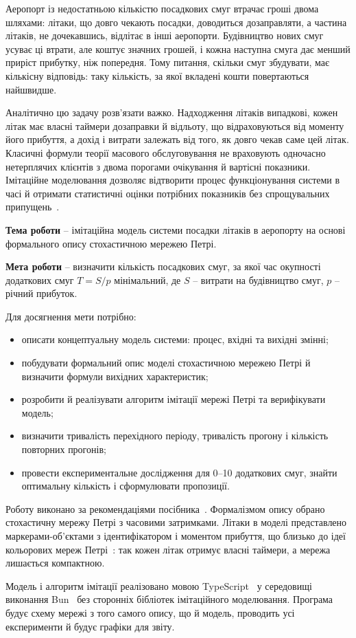 
Аеропорт із недостатньою кількістю посадкових смуг втрачає гроші двома шляхами: літаки, що довго чекають посадки, доводиться дозаправляти, а частина літаків, не дочекавшись, відлітає в інші аеропорти. Будівництво нових смуг усуває ці втрати, але коштує значних грошей, і кожна наступна смуга дає менший приріст прибутку, ніж попередня. Тому питання, скільки смуг збудувати, має кількісну відповідь: таку кількість, за якої вкладені кошти повертаються найшвидше.

Аналітично цю задачу розв'язати важко. Надходження літаків випадкові, кожен літак має власні таймери дозаправки й відльоту, що відраховуються від моменту його прибуття, а дохід і витрати залежать від того, як довго чекав саме цей літак. Класичні формули теорії масового обслуговування не враховують одночасно нетерплячих клієнтів з двома порогами очікування й вартісні показники. Імітаційне моделювання дозволяє відтворити процес функціонування системи в часі й отримати статистичні оцінки потрібних показників без спрощувальних припущень~\cite{stetsenko2010, tomashevskyi2005}.

\textbf{Тема роботи} -- імітаційна модель системи посадки літаків в аеропорту на основі формального опису стохастичною мережею Петрі.

\textbf{Мета роботи} -- визначити кількість посадкових смуг, за якої час окупності додаткових смуг $T = S/p$ мінімальний, де $S$ -- витрати на будівництво смуг, $p$ -- річний прибуток.

Для досягнення мети потрібно:
\begin{itemize}
\item описати концептуальну модель системи: процес, вхідні та вихідні змінні;
\item побудувати формальний опис моделі стохастичною мережею Петрі й визначити формули вихідних характеристик;
\item розробити й реалізувати алгоритм імітації мережі Петрі та верифікувати модель;
\item визначити тривалість перехідного періоду, тривалість прогону і кількість повторних прогонів;
\item провести експериментальне дослідження для 0--10 додаткових смуг, знайти оптимальну кількість і сформулювати пропозиції.
\end{itemize}

Роботу виконано за рекомендаціями посібника~\cite{stetsenko2024}. Формалізмом опису обрано стохастичну мережу Петрі з часовими затримками. Літаки в моделі представлено маркерами-об'єктами з ідентифікатором і моментом прибуття, що близько до ідеї кольорових мереж Петрі~\cite{jensen2009}: так кожен літак отримує власні таймери, а мережа лишається компактною.

Модель і алгоритм імітації реалізовано мовою TypeScript~\cite{typescript} у середовищі виконання Bun~\cite{bun} без сторонніх бібліотек імітаційного моделювання. Програма будує схему мережі з того самого опису, що й модель, проводить усі експерименти й будує графіки для звіту.
